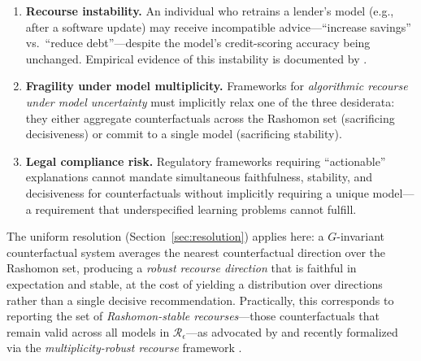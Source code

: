 \begin{enumerate}
  \item \textbf{Recourse instability.}  An individual who retrains a lender's
    model (e.g., after a software update) may receive incompatible
    advice---``increase savings'' vs.\ ``reduce debt''---despite the model's
    credit-scoring accuracy being unchanged.  Empirical evidence of this
    instability is documented by \citet{marx2024uncertainty}.

  \item \textbf{Fragility under model multiplicity.}  Frameworks for
    \emph{algorithmic recourse under model uncertainty} \citep{karimi2020algorithmic}
    must implicitly relax one of the three desiderata: they either aggregate
    counterfactuals across the Rashomon set (sacrificing decisiveness) or
    commit to a single model (sacrificing stability).

  \item \textbf{Legal compliance risk.}  Regulatory frameworks requiring
    ``actionable'' explanations \citep{euaiact2024} cannot mandate simultaneous
    faithfulness, stability, and decisiveness for counterfactuals without
    implicitly requiring a unique model---a requirement that underspecified
    learning problems cannot fulfill.
\end{enumerate}

The uniform resolution (Section~\ref{sec:resolution}) applies here: a
$G$-invariant counterfactual system averages the nearest counterfactual
direction over the Rashomon set, producing a \emph{robust recourse direction}
that is faithful in expectation and stable, at the cost of yielding a
distribution over directions rather than a single decisive recommendation.
Practically, this corresponds to reporting the set of \emph{Rashomon-stable
recourses}---those counterfactuals that remain valid across all models in
$\mathcal{R}_\epsilon$---as advocated by \citet{ustun2019actionable} and
recently formalized via the \emph{multiplicity-robust recourse} framework
\citep{karimi2020algorithmic}.
